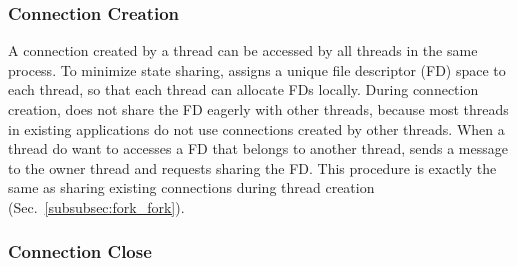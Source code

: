 
\subsubsection{Connection Creation}
\label{subsubsec:fork_new}

A connection created by a thread can be accessed by all threads in the same process. To minimize state sharing, \libipc assigns a unique file descriptor (FD) space to each thread, so that each thread can allocate FDs locally. 
During connection creation, \libipc does not share the FD eagerly with other threads, because most threads in existing applications do not use connections created by other threads.
When a thread do want to accesses a FD that belongs to another thread, \libipc sends a message to the owner thread and requests sharing the FD. This procedure is exactly the same as sharing existing connections during thread creation (Sec.~\ref{subsubsec:fork_fork}). %

\subsubsection{Connection Close}
\label{subsubsec:fork_close}


